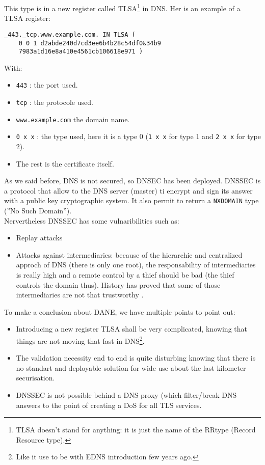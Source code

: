 \documentclass[journal, a4paper]{IEEEtran}
\begin{document}
This type is in a new register called TLSA\footnote{TLSA doesn't stand for anything: it is just the name of the RRtype (Record Resource type).} in DNS. Her is an example of a TLSA register:\\
\begin{Verbatim}[fontsize=\small]
_443._tcp.www.example.com. IN TLSA (
	0 0 1 d2abde240d7cd3ee6b4b28c54df0&34b9
	7983a1d16e8a410e4561cb106618e971 )
\end{Verbatim}
With:
\begin{itemize}
	\item \verb$443$ : the port used.
	\item \verb$tcp$ : the protocole used.
	\item \verb$www.example.com$ the domain name.
	\item \verb$0 x x$ : the type used, here it is a type 0 (\verb$1 x x$ for type 1 and \verb$2 x x$ for type 2).
	\item The rest is the certificate itself.
\end{itemize}

As we said before, DNS is not secured, so DNSEC has been deployed. DNSSEC is a protocol that allow to the DNS server (master) ti encrypt and sign its answer with a public key cryptographic system. It also permit to return a \verb$NXDOMAIN$ type (''No Such Domain'').\\
Nervertheless DNSSEC has some vulnaribilities such as:
\begin{itemize}
	\item Replay attacks
	\item Attacks against intermediaries: because of the hierarchic and centralized approch of DNS (there is only one root), the responsability of intermediaries is really high and a remote control by a thief should be bad (the thief controls the domain thus). History has proved that some of those intermediaries are not that trustworthy \cite{dan08} \cite{utk11}.
\end{itemize}

To make a conclusion about DANE, we have multiple points to point out:
\begin{itemize}
	\item Introducing a new register TLSA shall be very complicated, knowing that things are not moving that fast in DNS\footnote{Like it use to be with EDNS introduction few years ago.}.
	\item The validation necessity end to end is quite disturbing knowing that there is no standart and deployable solution for wide use  about the last kilometer securisation.
	\item DNSSEC is not possible behind a DNS proxy (which filter/break DNS answers to the point of creating a DoS for all TLS services.
\end{itemize}
\end{document}
